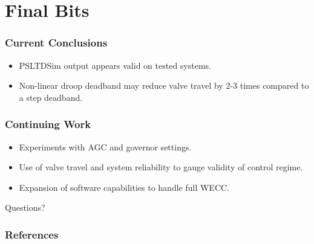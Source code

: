 \documentclass[14pt, unknownkeysallowed]{beamer}
\begin{document}
\section{Final Bits}
\begin{frame}
\frametitle{Current Conclusions}
\begin{itemize}
	\item PSLTDSim output appears valid on tested systems.
	\item Non-linear droop deadband may reduce valve travel by 2-3 times compared to a step deadband.
\end{itemize}
\end{frame}
\begin{frame}
\frametitle{Continuing Work}
\begin{itemize}
\item Experiments with AGC and governor settings.
\item Use of valve travel and system reliability to gauge validity of control regime.
\item Expansion of software capabilities to handle full WECC.
\end{itemize}
\end{frame}

\begin{frame}
\begin{center}
\Huge{Questions?}
\end{center}
\end{frame}

\begin{frame}[allowframebreaks]
\frametitle{References}
\renewcommand*{\bibfont}{\scriptsize} %
\printbibliography
\end{frame}
\end{document}
